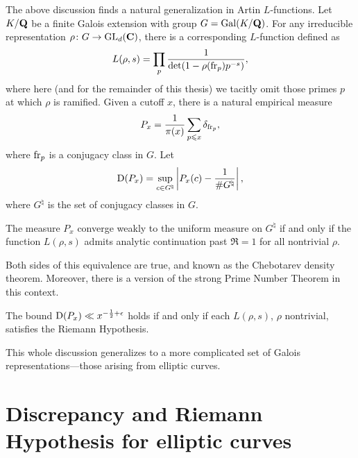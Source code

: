 The above discussion finds a natural generalization in Artin $L$-functions. 
Let $K/\mathbf{Q}$ be a finite Galois extension with group $G=\operatorname{Gal}(K/\mathbf{Q})$. For any 
irreducible representation $\rho\colon G\to \operatorname{GL}_d(\mathbf{C})$, there is a 
corresponding $L$-function defined as 
\[
	L(\rho,s) = \prod_p \frac{1}{\det(1-\rho(\mathrm{fr}_p) p^{-s})} ,
\]
where here (and for the remainder of this thesis) we tacitly omit those primes 
$p$ at which $\rho$ is ramified. Given a cutoff $x$, there is a natural 
empirical measure 
\[
	P_x = \frac{1}{\pi(x)} \sum_{p\leqslant x} \delta_{\mathrm{fr}_p} ,
\]
where $\mathrm{fr}_p$ is a conjugacy class in $G$. Let 
\[
	\operatorname{D}(P_x) = \sup_{c\in G^\natural} \left| P_x(c) - \frac{1}{\# G^\natural}\right|,
\]
where $G^\natural$ is the set of conjugacy classes in $G$. 

\begin{theorem}
The measure $P_x$ converge weakly to the uniform measure on $G^\natural$ if and 
only if the function $L(\rho,s)$ admits analytic continuation past $\Re =1$ for 
all nontrivial $\rho$. 
\end{theorem}

Both sides of this equivalence are true, and known as the Chebotarev density 
theorem. Moreover, there is a version of the strong Prime Number Theorem in 
this context. 

\begin{theorem}
The bound $\operatorname{D}(P_x) \ll x^{-\frac 1 2+\epsilon}$ holds if and only if each
$L(\rho,s)$, $\rho$ nontrivial, satisfies the Riemann Hypothesis. 
\end{theorem}

This whole discussion generalizes to a more complicated set of Galois 
representations---those arising from elliptic curves. 





\section{Discrepancy and Riemann Hypothesis for elliptic curves}

